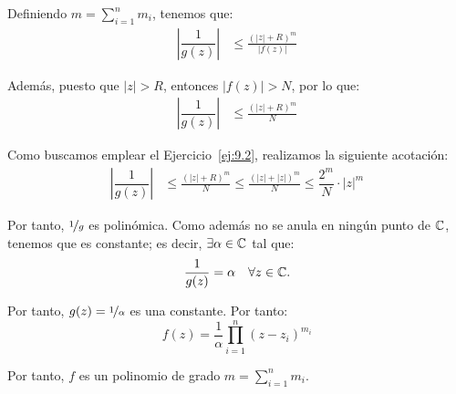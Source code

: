 \begin{ejercicio}
    Definiendo $m=\sum\limits_{i=1}^{n} m_i$, tenemos que:
    \begin{align*}
        \left|\dfrac{1}{g(z)}\right| &\leq \frac{\left(|z|+R\right)^{m}}{|f(z)|}
    \end{align*}

    Además, puesto que $|z|>R$, entonces $|f(z)|>N$, por lo que:
    \begin{align*}
        \left|\dfrac{1}{g(z)}\right| &\leq \frac{\left(|z|+R\right)^{m}}{N}
    \end{align*}

    Como buscamos emplear el Ejercicio~\ref{ej:9.2}, realizamos la siguiente acotación:
    \begin{align*}
        \left|\dfrac{1}{g(z)}\right| &\leq \frac{\left(|z|+R\right)^{m}}{N}\leq \frac{\left(|z|+|z|\right)^{m}}{N}\leq \dfrac{2^m}{N}\cdot |z|^m
    \end{align*}

    Por tanto, $\nicefrac{1}{g}$ es polinómica. Como además no se anula en ningún punto de $\mathbb{C}$, tenemos que es constante; es decir, $\exists \alpha\in \mathbb{C}$ tal que:
    \begin{equation*}
        \dfrac{1}{g(z)}=\alpha \quad \forall z\in \mathbb{C}.
    \end{equation*}

    Por tanto, $g(z)=\nicefrac{1}{\alpha}$ es una constante. Por tanto:
    \begin{equation*}
        f(z) = \dfrac{1}{\alpha} \prod_{i=1}^{n} (z-z_i)^{m_i}
    \end{equation*}

    Por tanto, $f$ es un polinomio de grado $m=\sum\limits_{i=1}^{n} m_i$.
\end{ejercicio}

